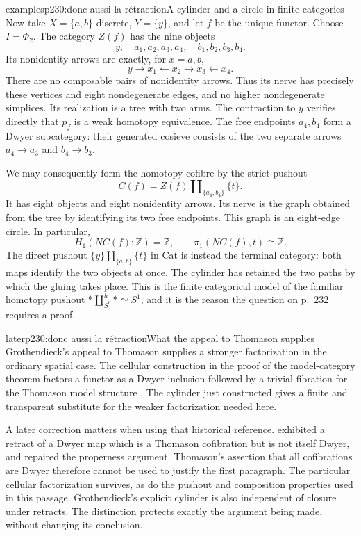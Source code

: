 \begin{dcomment}{examples}{p230:donc aussi la rétraction}{A cylinder and a circle in finite categories}
Now take $X=\{a,b\}$ discrete, $Y=\{y\}$, and let $f$ be the unique functor. Choose $I=\Phi_2$. The category $Z(f)$ has the nine objects
\[
 y,\quad a_1,a_2,a_3,a_4,\quad b_1,b_2,b_3,b_4.
\]
Its nonidentity arrows are exactly, for $x=a,b$,
\[
 y\longrightarrow x_1\longleftarrow x_2
       \longrightarrow x_3\longleftarrow x_4.
\]
There are no composable pairs of nonidentity arrows. Thus its nerve has precisely these vertices and eight nondegenerate edges, and no higher nondegenerate simplices. Its realization is a tree with two arms. The contraction to $y$ verifies directly that $p_f$ is a weak homotopy equivalence. The free endpoints $a_4,b_4$ form a Dwyer subcategory: their generated cosieve consists of the two separate arrows $a_4\to a_3$ and $b_4\to b_3$.

We may consequently form the homotopy cofibre by the strict pushout
\[
 C(f)=Z(f)\amalg_{\{a_4,b_4\}}\{t\}.
\]
It has eight objects and eight nonidentity arrows. Its nerve is the graph obtained from the tree by identifying its two free endpoints. This graph is an eight-edge circle. In particular,
\[
 H_1(NC(f);\mathbb Z)=\mathbb Z,
 \qquad \pi_1(NC(f),t)\cong\mathbb Z.
\]
The direct pushout $\{y\}\amalg_{\{a,b\}}\{t\}$ in $\mathrm{Cat}$ is instead the terminal category: both maps identify the two objects at once. The cylinder has retained the two paths by which the gluing takes place. This is the finite categorical model of the familiar homotopy pushout $*\amalg^h_{S^0}*\simeq S^1$, and it is the reason the question on p.~232 requires a proof.
\end{dcomment}

\begin{dcomment}{later}{p230:donc aussi la rétraction}{What the appeal to Thomason supplies}
Grothendieck's appeal to Thomason supplies a stronger factorization in the ordinary spatial case. The cellular construction in the proof of the model-category theorem factors a functor as a Dwyer inclusion followed by a trivial fibration for the Thomason model structure \citep[proof of CM5 and Theorem~4.9]{Thomason1980}. The cylinder just constructed gives a finite and transparent substitute for the weaker factorization needed here.

A later correction matters when using that historical reference. \citet{Cisinski1999Dwyer} exhibited a retract of a Dwyer map which is a Thomason cofibration but is not itself Dwyer, and repaired the properness argument. Thomason's assertion that all cofibrations are Dwyer therefore cannot be used to justify the first paragraph. The particular cellular factorization survives, as do the pushout and composition properties used in this passage. Grothendieck's explicit cylinder is also independent of closure under retracts. The distinction protects exactly the argument being made, without changing its conclusion.
\end{dcomment}

